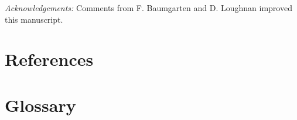 \documentclass[11pt]{article}
\begin{document}
\emph{Acknowledgements:} Comments from F. Baumgarten and D. Loughnan improved this manuscript. 

\newpage
\section{References}
\vspace{-5ex}


\clearpage

\section{Glossary}

\end{document}
